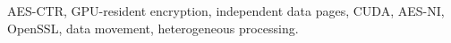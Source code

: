 AES-CTR, GPU-resident encryption, independent data pages, CUDA, AES-NI, OpenSSL, data movement, heterogeneous processing.

